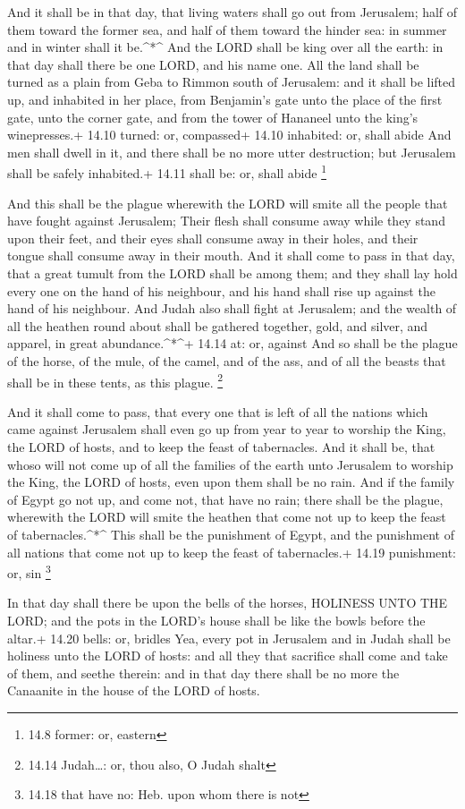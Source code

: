  And it shall be in that day, that living waters shall go
out from Jerusalem; half of them toward the former sea, and half of them
toward the hinder sea: in summer and in winter shall it be.\^{}*\^{}
 And the LORD shall be king over all the earth: in that day
shall there be one LORD, and his name one.  All the land
shall be turned as a plain from Geba to Rimmon south of Jerusalem: and
it shall be lifted up, and inhabited in her place, from Benjamin's gate
unto the place of the first gate, unto the corner gate, and from the
tower of Hananeel unto the king's winepresses.+ 14.10 turned: or,
compassed+ 14.10 inhabited: or, shall abide  And men shall
dwell in it, and there shall be no more utter destruction; but Jerusalem
shall be safely inhabited.+ 14.11 shall be: or, shall abide \footnote{14.8
  former: or, eastern}

 And this shall be the plague wherewith the LORD will smite
all the people that have fought against Jerusalem; Their flesh shall
consume away while they stand upon their feet, and their eyes shall
consume away in their holes, and their tongue shall consume away in
their mouth.  And it shall come to pass in that day, that a
great tumult from the LORD shall be among them; and they shall lay hold
every one on the hand of his neighbour, and his hand shall rise up
against the hand of his neighbour.  And Judah also shall
fight at Jerusalem; and the wealth of all the heathen round about shall
be gathered together, gold, and silver, and apparel, in great
abundance.\^{}*\^{}+ 14.14 at: or, against  And so shall be
the plague of the horse, of the mule, of the camel, and of the ass, and
of all the beasts that shall be in these tents, as this plague.
\footnote{14.14 Judah\ldots: or, thou also, O Judah shalt}

 And it shall come to pass, that every one that is left of
all the nations which came against Jerusalem shall even go up from year
to year to worship the King, the LORD of hosts, and to keep the feast of
tabernacles.  And it shall be, that whoso will not come up
of all the families of the earth unto Jerusalem to worship the King, the
LORD of hosts, even upon them shall be no rain.  And if the
family of Egypt go not up, and come not, that have no rain; there shall
be the plague, wherewith the LORD will smite the heathen that come not
up to keep the feast of tabernacles.\^{}*\^{}  This shall
be the punishment of Egypt, and the punishment of all nations that come
not up to keep the feast of tabernacles.+ 14.19 punishment: or, sin
\footnote{14.18 that have no: Heb. upon whom there is not}

 In that day shall there be upon the bells of the horses,
HOLINESS UNTO THE LORD; and the pots in the LORD's house shall be like
the bowls before the altar.+ 14.20 bells: or, bridles  Yea,
every pot in Jerusalem and in Judah shall be holiness unto the LORD of
hosts: and all they that sacrifice shall come and take of them, and
seethe therein: and in that day there shall be no more the Canaanite in
the house of the LORD of hosts.
